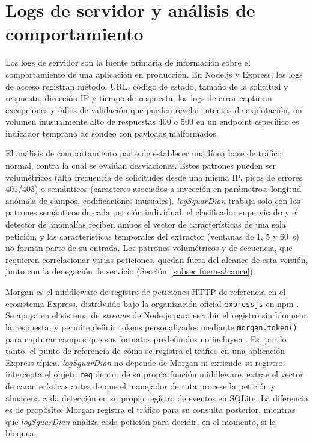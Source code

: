 \section{Logs de servidor y análisis de comportamiento}
Los logs de servidor son la fuente primaria de información sobre el comportamiento de una
aplicación en producción. En Node.js y Express, los logs de acceso registran método, URL, código
de estado, tamaño de la solicitud y respuesta, dirección IP y tiempo de respuesta; los logs de error
capturan excepciones y fallos de validación que pueden revelar intentos de explotación, un volumen
inusualmente alto de respuestas 400 o 500 en un endpoint específico es indicador temprano de
sondeo con payloads malformados.

El análisis de comportamiento parte de establecer una línea base de tráfico normal, contra la cual
se evalúan desviaciones. Estos patrones pueden ser volumétricos (alta frecuencia de solicitudes
desde una misma IP, picos de errores 401/403) o semánticos (caracteres asociados a inyección en
parámetros, longitud anómala de campos, codificaciones inusuales). \textit{logSguarDian} trabaja
solo con los patrones semánticos de cada petición individual: el clasificador supervisado y el
detector de anomalías reciben ambos el vector de características de una sola petición, y las
características temporales del extractor (ventanas de 1, 5 y 60~s) no forman parte de su entrada.
Los patrones volumétricos y de secuencia, que requieren correlacionar varias peticiones, quedan
fuera del alcance de esta versión, junto con la denegación de servicio
(Sección~\ref{subsec:fuera-alcance}).

Morgan es el middleware de registro de peticiones HTTP de referencia en el ecosistema Express,
distribuido bajo la organización oficial \texttt{expressjs} en npm \cite{expressjsmorgan}. Se apoya
en el sistema de \textit{streams} de Node.js para escribir el registro sin bloquear la respuesta, y
permite definir tokens personalizados mediante \texttt{morgan.token()} para capturar campos que sus
formatos predefinidos no incluyen \cite{expressjsmorgan}. Es, por lo tanto, el punto de referencia
de cómo se registra el tráfico en una aplicación Express típica. \textit{logSguarDian} no depende
de Morgan ni extiende su registro: intercepta el objeto \texttt{req} dentro de su propia función
middleware, extrae el vector de características antes de que el manejador de ruta procese la
petición y almacena cada detección en su propio registro de eventos en SQLite. La diferencia es de
propósito: Morgan registra el tráfico para su consulta posterior, mientras que
\textit{logSguarDian} analiza cada petición para decidir, en el momento, si la bloquea.

